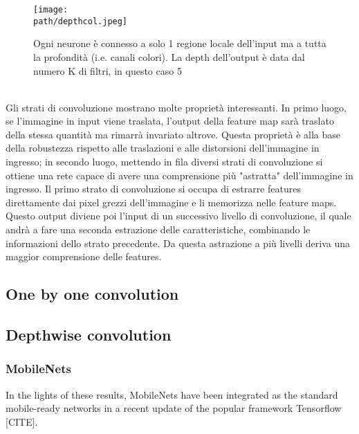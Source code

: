 \begin{figure}[h!]
 \centering
 \texttt{[image: \\path/depthcol.jpeg]} 
 \caption{Ogni neurone è connesso a solo 1 regione locale dell'input ma a tutta la profondità (i.e. canali colori). La depth dell'output è data dal numero K di filtri, in questo caso 5}
 \label{fig:depth}
\end{figure}\\
Gli strati di convoluzione mostrano molte proprietà interessanti.
In primo luogo, se l'immagine in input viene traslata, l'output della feature map sarà traslato della stessa quantità ma rimarrà invariato altrove. Questa proprietà è alla base della robustezza rispetto alle traslazioni e alle distorsioni dell'immagine in ingresso; in secondo luogo, mettendo in fila diversi strati di convoluzione si ottiene una rete capace di avere una comprensione più "astratta" dell'immagine in ingresso. Il primo strato di convoluzione si occupa di estrarre features direttamente dai pixel grezzi dell'immagine e li memorizza nelle feature maps. Questo output diviene poi l'input di un successivo livello di convoluzione, il quale andrà a fare una seconda estrazione delle caratteristiche, combinando le informazioni dello strato precedente. Da questa astrazione a più livelli deriva una maggior comprensione delle features. \\

\subsection{One by one convolution}

\subsection{Depthwise convolution}

\subsubsection{MobileNets}
 In the lights of these results, MobileNets have been integrated as the standard mobile-ready networks in a recent update of the popular framework Tensorflow [CITE].


